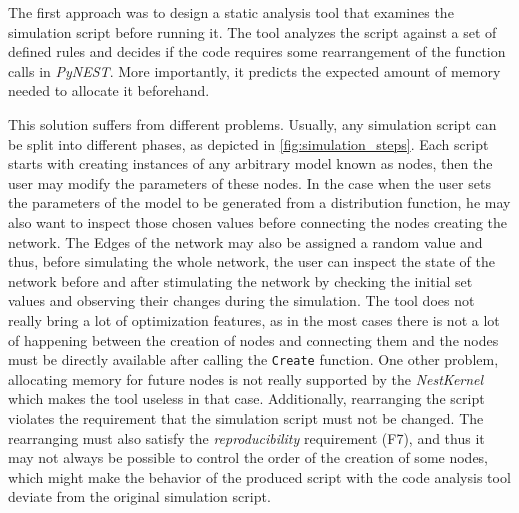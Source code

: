 The first approach was to design a static analysis tool that examines the simulation script before running it. The tool analyzes the script against a set of defined rules and decides if the code requires some rearrangement of the function calls in \emph{PyNEST}. More importantly, it predicts the expected amount of memory needed to allocate it beforehand. 

This solution suffers from different problems. Usually, any simulation script can be split into different phases, as depicted in \ref{fig:simulation_steps}. Each script starts with creating instances of any arbitrary model known as nodes, then the user may modify the parameters of these nodes. In the case when the user sets the parameters of the model to be generated from a distribution function, he may also want to inspect those chosen values before connecting the nodes creating the network. The Edges of the network may also be assigned  a random value and thus, before simulating the whole network, the user can inspect the state of the network before and after stimulating the network by checking the initial set values and observing their changes during the simulation. The tool does not really bring a lot of optimization features, as in the most cases there is not a lot of happening between the creation of nodes and connecting them and the nodes must be directly available after calling the \texttt{Create} function. One other problem, allocating memory for future nodes is not really supported by the \emph{NestKernel} which makes the tool useless in that case. Additionally, rearranging the script violates the requirement that the simulation script must not be changed. The rearranging must also satisfy the \emph{reproducibility} requirement (F7), and thus it may not always be possible to control the order of the creation of some nodes, which might make the behavior of the produced script with the code analysis tool deviate from the original simulation script.

\vspace{0.5cm}


